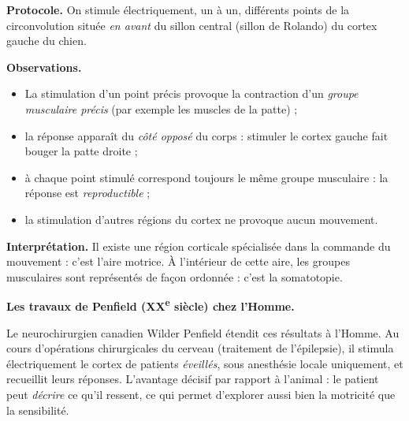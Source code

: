 \documentclass[11pt]{article}
\newcommand{\cle}[1]{{\popxbold\color{popdark}#1}}
\begin{document}
\begin{experience}
\textbf{Protocole.} On stimule électriquement, un à un, différents points de la circonvolution située \emph{en avant} du sillon central (sillon de Rolando) du cortex gauche du chien.

\textbf{Observations.}
\begin{itemize}
\item La stimulation d'un point précis provoque la contraction d'un \emph{groupe musculaire précis} (par exemple les muscles de la patte) ;
\item la réponse apparaît du \emph{côté opposé} du corps : stimuler le cortex gauche fait bouger la patte droite ;
\item à chaque point stimulé correspond toujours le même groupe musculaire : la réponse est \emph{reproductible} ;
\item la stimulation d'autres régions du cortex ne provoque aucun mouvement.
\end{itemize}

\textbf{Interprétation.} Il existe une région corticale spécialisée dans la commande du mouvement : c'est l'\cle{aire motrice}. À l'intérieur de cette aire, les groupes musculaires sont représentés de façon ordonnée : c'est la \cle{somatotopie}.
\end{experience}

\textbf{Les travaux de Penfield (XX\textsuperscript{e} siècle) chez l'Homme.}

Le neurochirurgien canadien Wilder Penfield étendit ces résultats à l'Homme. Au cours d'opérations chirurgicales du cerveau (traitement de l'épilepsie), il stimula électriquement le cortex de patients \emph{éveillés}, sous anesthésie locale uniquement, et recueillit leurs réponses. L'avantage décisif par rapport à l'animal : le patient peut \emph{décrire} ce qu'il ressent, ce qui permet d'explorer aussi bien la motricité que la sensibilité.
\end{document}
